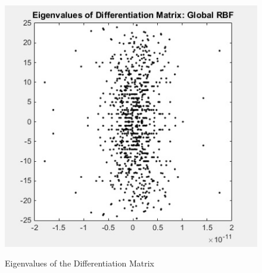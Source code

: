 \documentclass[11pt]{article}
\begin{document}
\begin{figure}[h!]
\centering
\includegraphics[scale=0.7]{globalRBF_eigenvals.jpg}\\
\caption{Eigenvalues of the Differentiation Matrix}
\label{fig:GlobalRBFevs}
\end{figure}
\end{document}
